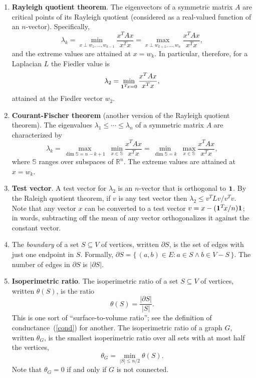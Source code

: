 \documentclass[11pt]{article}
\newcommand{\m}[1]{{\bf{#1}}}       %
\newcommand{\ones}{\m1}             %
\newcommand{\Real}{\mathbb{R}}          %
\begin{document}
\begin{enumerate}
\item\label{RQT}{\bf Rayleigh quotient theorem}.
The eigenvectors of a symmetric matrix $A$ are critical points of its
Rayleigh quotient (considered as a real-valued function of an $n$-vector).
Specifically, 
$$\lambda_k = \min_{x\perp w_1,\ldots,w_{k-1}} \frac{x^TAx}{x^Tx}
            = \max_{x\perp w_{k+1},\ldots,w_n} \frac{x^TAx}{x^Tx},$$
and the extreme values are attained at $x = w_k$.
In particular, therefore, for a Laplacian $L$ the Fiedler value is
$$\lambda_2 = \min_{\ones^T\!x=0} \frac{x^TAx}{x^Tx},$$
attained at the Fiedler vector $w_2$.

\item\label{CFT}{\bf Courant-Fischer theorem}
(another version of the Rayleigh quotient theorem).
The eigenvalues $\lambda_1\leq\cdots\leq\lambda_n$ of a symmetric matrix $A$ 
are characterized by
$$\lambda_k = \max_{\dim \mathbb{S}=n-k+1}\;\min_{x\in \mathbb{S}}\frac{x^TAx}{x^Tx}
            = \min_{\dim \mathbb{S}=k}\;\max_{x\in \mathbb{S}}\frac{x^TAx}{x^Tx},$$
where $\mathbb{S}$ ranges over subspaces of $\Real^n$.
The extreme values are attained at $x = w_k$.

\item{\bf Test vector}.
A test vector for $\lambda_2$ is an $n$-vector that is
orthogonal to $\ones$.  By the Raleigh quotient theorem,
if $v$ is any test vector then $\lambda_2 \leq v^TLv/v^Tv$.
Note that any vector $x$ can be converted to a test vector 
$v = x - (\ones^T\!x/n) \ones$; in words, subtracting off
the mean of any vector orthogonalizes it against the constant
vector.

\item
The {\em boundary} of a set $S\subseteq V$ of vertices, written $\partial S$,
is the set of edges with just one endpoint in $S$. Formally,
$\partial S = \{\,(a,b)\in E : a \in S \wedge b \in V-S\,\}$.
The number of edges in $\partial S$ is $|\partial S|$.

\item\label{isop}{\bf Isoperimetric ratio}.
The isoperimetric ratio of a set $S\subseteq V$ of vertices,
written $\theta(S)$, is the ratio
$$\theta(S) = \frac{|\partial S|}{|S|}.$$
This is one sort of ``surface-to-volume ratio''; 
see the definition of conductance~(\ref{cond}) 
for another.
The isoperimetric ratio of a graph $G$,
written $\theta_G$, is the smallest isoperimetric ratio over all 
sets with at most half the vertices,
$$\theta_G = \min_{|S|\leq n/2}\theta(S).$$
Note that $\theta_G=0$ if and only if $G$ is not connected.


\end{enumerate}
\end{document}
